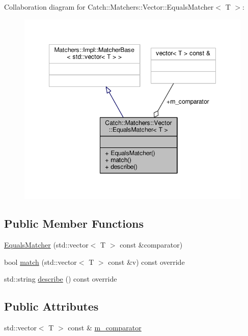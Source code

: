 Collaboration diagram for Catch\-:\-:Matchers\-:\-:Vector\-:\-:Equals\-Matcher$<$ T $>$\-:
\nopagebreak
\begin{figure}[H]
\begin{center}
\leavevmode
\includegraphics[width=348pt]{struct_catch_1_1_matchers_1_1_vector_1_1_equals_matcher__coll__graph}
\end{center}
\end{figure}
\subsection*{Public Member Functions}
\begin{DoxyCompactItemize}
\item 
\hyperlink{struct_catch_1_1_matchers_1_1_vector_1_1_equals_matcher_a3846c47780d1991dcfe87aefded98008}{Equals\-Matcher} (std\-::vector$<$ T $>$ const \&comparator)
\item 
bool \hyperlink{struct_catch_1_1_matchers_1_1_vector_1_1_equals_matcher_a2d96cca58a44151fddc5257eda3305da}{match} (std\-::vector$<$ T $>$ const \&v) const override
\item 
std\-::string \hyperlink{struct_catch_1_1_matchers_1_1_vector_1_1_equals_matcher_a36b5f7ecada4081d6c65bebe8ddea6f4}{describe} () const override
\end{DoxyCompactItemize}
\subsection*{Public Attributes}
\begin{DoxyCompactItemize}
\item 
std\-::vector$<$ T $>$ const \& \hyperlink{struct_catch_1_1_matchers_1_1_vector_1_1_equals_matcher_a56f7aa6f110a12b1b9aeb0cabbc9d755}{m\-\_\-comparator}
\end{DoxyCompactItemize}


